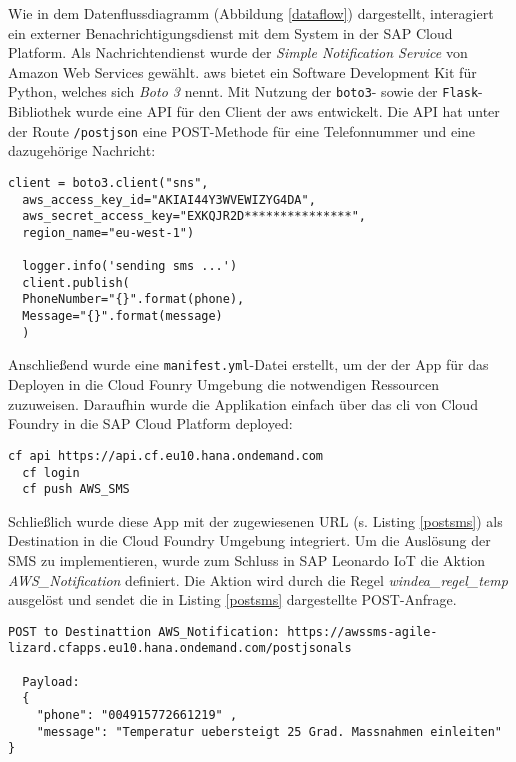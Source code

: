 Wie in dem Datenflussdiagramm (Abbildung \ref{dataflow}) dargestellt, interagiert ein externer Benachrichtigungsdienst mit dem System in der SAP Cloud Platform. Als Nachrichtendienst wurde der \textit{Simple Notification Service} von Amazon Web Services gewählt. \ac{aws} bietet ein Software Development Kit für Python, welches sich \textit{Boto 3} nennt. Mit Nutzung der \texttt{boto3}- sowie der \texttt{Flask}-Bibliothek wurde eine API für den Client der \ac{aws} entwickelt. Die API hat unter der Route \texttt{/postjson} eine POST-Methode für eine Telefonnummer und eine dazugehörige Nachricht:
\newline
\begin{lstlisting}[caption= Flask-API für AWS SNS]
  client = boto3.client("sns",
  aws_access_key_id="AKIAI44Y3WVEWIZYG4DA",
  aws_secret_access_key="EXKQJR2D***************",
  region_name="eu-west-1")

  logger.info('sending sms ...')
  client.publish(
  PhoneNumber="{}".format(phone),
  Message="{}".format(message)
  )
\end{lstlisting}
\vspace{5mm}
\noindent Anschließend wurde eine \texttt{manifest.yml}-Datei erstellt, um der der App für das Deployen in die Cloud Founry Umgebung die notwendigen Ressourcen zuzuweisen. Daraufhin wurde die Applikation einfach über das \ac{cli} von Cloud Foundry in die SAP Cloud Platform deployed:
\begin{lstlisting}[caption= Deployment in die SAP Cloud Platform]
  cf api https://api.cf.eu10.hana.ondemand.com
  cf login
  cf push AWS_SMS
\end{lstlisting}

\noindent Schließlich wurde diese App mit der zugewiesenen URL (s. Listing \ref{postsms}) als Destination in die Cloud Foundry Umgebung integriert. Um die Auslösung der SMS zu implementieren, wurde zum Schluss in SAP Leonardo IoT die Aktion \textit{AWS\_Notification} definiert. Die Aktion wird durch die Regel \textit{windea\_regel\_temp} ausgelöst und sendet die in Listing \ref{postsms} dargestellte POST-Anfrage.
\newline
\begin{lstlisting}[caption=JSON Payload an Destination, label=postsms]
  POST to Destinattion AWS_Notification: https://awssms-agile-lizard.cfapps.eu10.hana.ondemand.com/postjsonals

  Payload:
  {
    "phone": "004915772661219" ,
    "message": "Temperatur uebersteigt 25 Grad. Massnahmen einleiten"
}
\end{lstlisting}

